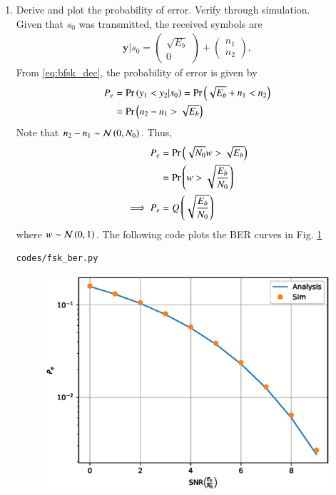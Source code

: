 \documentclass[journal,12pt,twocolumn]{IEEEtran}
\renewcommand\thesection{\arabic{section}}
\begin{document}
\begin{enumerate}[label=\thesection.\arabic*.,ref=\thesection.\theenumi]
\item
Derive and plot the probability of error.  Verify through simulation.
\\
\solution Given that $s_0$ was transmitted, the received symbols are
\begin{align}
\mathbf{y}|s_0 = 
\begin{pmatrix*}
\sqrt{E_b} \\
0
\end{pmatrix*}
+
\begin{pmatrix*}
 n_{1}\\
n_{2}
\end{pmatrix*},
\end{align}
From \eqref{eq:bfsk_dec}, 
the probability of error is given by
\begin{align}
P_e &= \Pr\left(y_1 < y_2|s_0\right) = \Pr\left(\sqrt{E_b} + n_1 < n_2\right)
\\
&= \Pr\left( n_2-n_1 > \sqrt{E_b} \right) 
\label{eq:bfsk_proof_n0}
\end{align}
Note that $n_2-n_1 \sim \mathcal{N}\left(0,N_0\right)$. Thus, 
\begin{align}
P_e &= \Pr\left( \sqrt{N_0}w > \sqrt{E_b} \right)  
\\
&=  \Pr\left( w > \sqrt{\frac{E_b}{N_0}} \right)
\\
\implies 
P_e & = Q\left(\sqrt{\frac{E_b}{N_0}}\right)
\end{align}
where 
$w \sim \mathcal{N}\left(0,1\right)$.  
%
The following code plots the BER curves in Fig. \ref{fig:bfsk_ber}
\begin{lstlisting}
codes/fsk_ber.py
\end{lstlisting}
%
\begin{figure}[!h]
\centering
\includegraphics[width=\columnwidth]{./figs/bfsk_ber.eps}
\caption{}
\label{fig:bfsk_ber}
\end{figure}

\end{enumerate}
\end{document}
